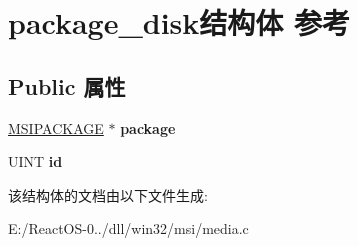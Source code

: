 \hypertarget{structpackage__disk}{}\section{package\+\_\+disk结构体 参考}
\label{structpackage__disk}
\subsection*{Public 属性}
\begin{DoxyCompactItemize}
\item 
\mbox{\label{structpackage__disk_a0b64db0ba656a55e24e0e6045129af51}} 
\hyperlink{structtag_m_s_i_p_a_c_k_a_g_e}{M\+S\+I\+P\+A\+C\+K\+A\+GE} $\ast$ {\bfseries package}
\item 
\mbox{\label{structpackage__disk_a20f30ee2f0d24dd5cd3f54285bd8d04d}} 
U\+I\+NT {\bfseries id}
\end{DoxyCompactItemize}


该结构体的文档由以下文件生成\+:\begin{DoxyCompactItemize}
\item 
E\+:/\+React\+O\+S-\/0../dll/win32/msi/media.\+c\end{DoxyCompactItemize}
